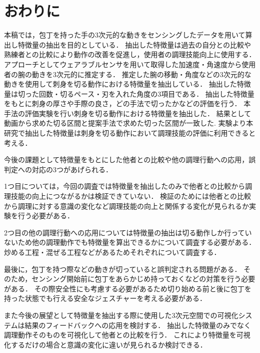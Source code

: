\section{おわりに}

本稿では，包丁を持った手の3次元的な動きをセンシングしたデータを用いて算出し特徴量の抽出を目的としている．
抽出した特徴量は過去の自分との比較や熟練者との比較により動作の改善を促進し，使用者の調理技能向上に使用する．
アプローチとしてウェアラブルセンサを用いて取得した加速度・角速度から使用者の腕の動きを3次元的に推定する．
推定した腕の移動・角度などの3次元的な動きを使用して刺身を切る動作における特徴量を抽出している．
抽出した特徴量は切った回数・切るペース・刃を入れた角度の3項目である．
抽出した特徴量をもとに刺身の厚さや手際の良さ，どの手法で切ったかなどの評価を行う．
本手法の評価実験を行い刺身を切る動作における特徴量を抽出した．
結果として動画から求めた切る区間と提案手法で求めた切った区間が一致した.
実験より本研究で抽出した特徴量は刺身を切る動作において調理技能の評価に利用できると考える．

今後の課題として特徴量をもとにした他者との比較や他の調理行動への応用，誤判定への対応の3つがあげられる．

1つ目については，今回の調査では特徴量を抽出したのみで他者との比較から調理技能の向上につながるかは検証できていない．
検証のためには他者との比較から調理に対する意識の変化など調理技能の向上と関係する変化が見られるか実験を行う必要がある．

2つ目の他の調理行動への応用については特徴量の抽出は切る動作しか行っていないため他の調理動作でも特徴量を算出できるかについて調査する必要がある．
炒める工程・混ぜる工程などがあるためそれぞれについて調査する．

最後に，包丁を持つ際などの動きが切っていると誤判定される問題がある．
そのため，センシング開始前に包丁をあらかじめ持っておくなどの対策を行う必要がある．
その際安全性にも考慮する必要があるため切り始める前と後に包丁を持った状態でも行える安全なジェスチャーを考える必要がある．

また今後の展望として特徴量を抽出する際に使用した3次元空間での可視化システムは結果のフィードバックへの応用を検討する．
抽出した特徴量のみでなく調理動作そのものを可視化して他者との比較を行う．
これにより特徴量を可視化するだけの場合と意識の変化に違いが見られるか検討できる．